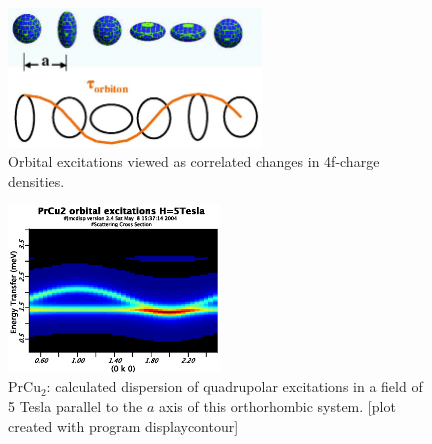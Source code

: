 \begin{figure}[hb]%
\begin{center}\leavevmode
\includegraphics[angle=0, width=0.6\textwidth]{./figsrc/orbiton.ps}
\end{center}
\caption{Orbital excitations viewed  as correlated changes in 4f-charge densities.}
\label{qmodes}
\end{figure}

\begin{figure}[hb]%
\begin{center}\leavevmode
\includegraphics[angle=0, width=0.5\textwidth]{./figsrc/prcu2_0k0_5T.eps}
\end{center}
\caption{PrCu$_2$: calculated dispersion of quadrupolar excitations in a field of 5 Tesla parallel to the $a$ axis %
of this orthorhombic system.
[plot created with program {\prg displaycontour}]}
\label{qintensity}
\end{figure}
